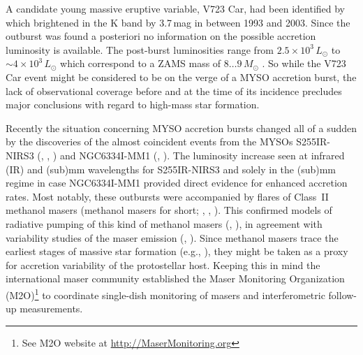\documentclass[longauth,usenatbib]{aa}
\begin{document}
A candidate young massive eruptive variable, V723 Car, had been identified by  which brightened in the K band by 3.7\,mag in between 1993 and 2003. Since the outburst was found a posteriori no information on the possible accretion luminosity is available. The post-burst luminosities range from $2.5{\times}10^3\,L_\odot$  to ${\sim}4\times10^3\,L_\odot$  which correspond to a ZAMS mass of $8\dots9\,M_\odot$ . So while the V723 Car event might be considered to be on the verge of a MYSO accretion burst, the lack of observational coverage before and at the time of its incidence precludes major conclusions with regard to high-mass star formation.

Recently the situation concerning MYSO accretion bursts changed all of a sudden by the discoveries of the almost coincident events from the MYSOs S255IR-NIRS3 (, , ) and NGC6334I-MM1 (, ). The luminosity increase seen at infrared (IR) and (sub)mm wavelengths for S255IR-NIRS3 and solely in the (sub)mm regime in case NGC6334I-MM1 provided direct evidence for enhanced accretion rates. Most notably, these outbursts were accompanied by flares of Class~II methanol masers (methanol masers for short; , , ). This confirmed models of radiative pumping of this kind of methanol masers (, ), in agreement with variability studies of the maser emission (, ). Since methanol masers trace the earliest stages of massive star formation (e.g., ), they might be taken as a proxy for accretion variability of the protostellar host. Keeping this in mind the international maser community established the Maser Monitoring Organization (M2O)\footnote{See M2O website at \url{http://MaserMonitoring.org}} to coordinate single-dish monitoring of masers and interferometric follow-up measurements.
\end{document}
